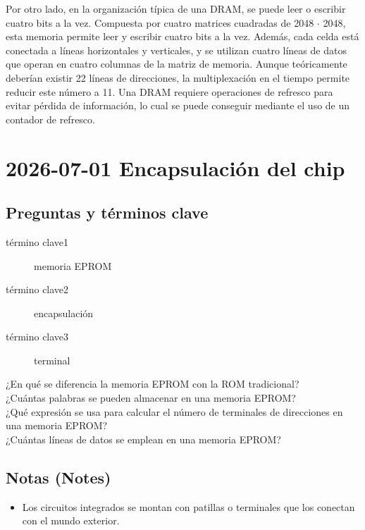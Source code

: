\documentclass{article}
\begin{document}
Por otro lado, en la organización típica de una DRAM, se puede leer o  escribir cuatro
bits a la vez. Compuesta por cuatro matrices cuadradas de 2048 \(\cdot\)
2048, esta memoria permite leer y escribir cuatro bits a la
vez. Además, cada celda está conectada a líneas horizontales y
verticales, y se utilizan cuatro líneas de datos que operan en cuatro
columnas de la matriz de memoria. Aunque teóricamente deberían existir
22 líneas de direcciones, la multiplexación en el tiempo permite reducir
este número a 11. Una DRAM requiere operaciones de refresco para
evitar pérdida de información, lo cual se puede conseguir mediante el
uso de un contador de refresco. 

\section{2026-07-01 Encapsulación del chip}
\label{sec:org4d76953}

\subsection{Preguntas y términos clave}
\label{sec:org1c8ac26}
\begin{description}
\item[{término clave1}] memoria EPROM
\item[{término clave2}] encapsulación
\item[{término clave3}] terminal
\item[{¿En qué se diferencia la memoria EPROM con la ROM tradicional?}] 

\item[{¿Cuántas palabras se pueden almacenar en una memoria EPROM?}] 

\item[{¿Qué expresión se usa para calcular el número de terminales de direcciones en una memoria EPROM?}] 

\item[{¿Cuántas líneas de datos se emplean en una memoria EPROM?}] 
\end{description}

\subsection{Notas (Notes)}
\label{sec:orgd871897}
\begin{itemize}
\item Los circuitos integrados se montan con patillas o terminales que los
conectan con el mundo exterior.
\end{itemize}
\end{document}
